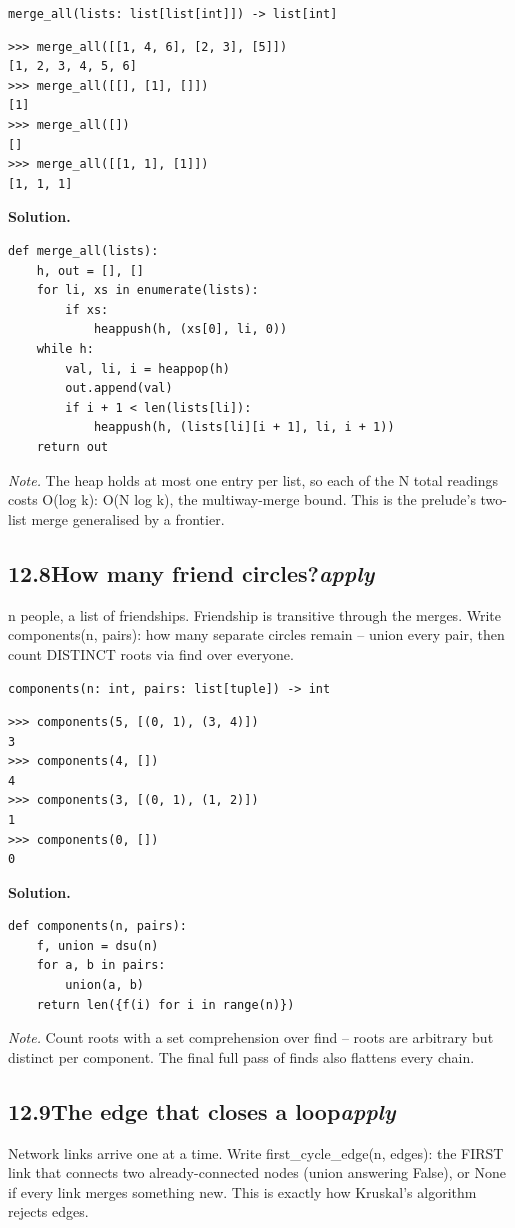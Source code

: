 \documentclass[10pt,letterpaper]{book}
\begin{document}
\noindent\texttt{merge\_all(lists: list[list[int]]) -> list[int]}
\begin{lstlisting}[style=ex]
>>> merge_all([[1, 4, 6], [2, 3], [5]])
[1, 2, 3, 4, 5, 6]
>>> merge_all([[], [1], []])
[1]
>>> merge_all([])
[]
>>> merge_all([[1, 1], [1]])
[1, 1, 1]
\end{lstlisting}
\noindent\textbf{Solution.}
\begin{lstlisting}[style=code]
def merge_all(lists):
    h, out = [], []
    for li, xs in enumerate(lists):
        if xs:
            heappush(h, (xs[0], li, 0))
    while h:
        val, li, i = heappop(h)
        out.append(val)
        if i + 1 < len(lists[li]):
            heappush(h, (lists[li][i + 1], li, i + 1))
    return out
\end{lstlisting}
\noindent\textit{Note.} The heap holds at most one entry per list, so each of the N total readings costs O(log k): O(N log k), the multiway-merge bound. This is the prelude's two-list merge generalised by a frontier.

\subsection*{12.8\quad How many friend circles?\hfill\textnormal{\textit{apply}}}
n people, a list of friendships. Friendship is transitive through the merges. Write components(n, pairs): how many separate circles remain -- union every pair, then count DISTINCT roots via find over everyone.

\noindent\texttt{components(n: int, pairs: list[tuple]) -> int}
\begin{lstlisting}[style=ex]
>>> components(5, [(0, 1), (3, 4)])
3
>>> components(4, [])
4
>>> components(3, [(0, 1), (1, 2)])
1
>>> components(0, [])
0
\end{lstlisting}
\noindent\textbf{Solution.}
\begin{lstlisting}[style=code]
def components(n, pairs):
    f, union = dsu(n)
    for a, b in pairs:
        union(a, b)
    return len({f(i) for i in range(n)})
\end{lstlisting}
\noindent\textit{Note.} Count roots with a set comprehension over find -- roots are arbitrary but distinct per component. The final full pass of finds also flattens every chain.

\subsection*{12.9\quad The edge that closes a loop\hfill\textnormal{\textit{apply}}}
Network links arrive one at a time. Write first\_cycle\_edge(n, edges): the FIRST link that connects two already-connected nodes (union answering False), or None if every link merges something new. This is exactly how Kruskal's algorithm rejects edges.
\end{document}
